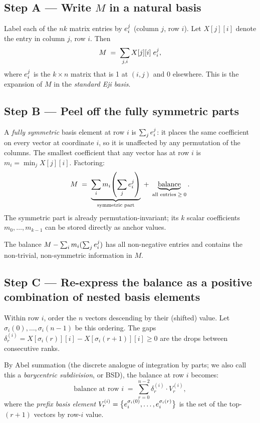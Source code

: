 \subsection*{Step A — Write $M$ in a natural basis}

Label each of the $nk$ matrix entries by $e^{j}_{i}$ (column $j$, row $i$).
Let $X[j][i]$ denote the entry in column $j$, row $i$.  Then
\[
  M \;=\; \sum_{j,i} X[j][i]\;e^{j}_{i},
\]
where $e^{j}_{i}$ is the $k\times n$ matrix that is 1 at $(i,j)$ and 0
elsewhere.  This is the expansion of $M$ in the \emph{standard Eji basis}.

\subsection*{Step B — Peel off the fully symmetric parts}

A \emph{fully symmetric} basis element at row $i$ is $\sum_j e^{j}_{i}$: it
places the same coefficient on every vector at coordinate $i$, so it is
unaffected by any permutation of the columns.  The smallest coefficient that
any vector has at row $i$ is $m_i = \min_j X[j][i]$.  Factoring:
\[
  M \;=\; \underbrace{\sum_i m_i \!\left(\sum_j e^{j}_{i}\right)}_{\text{symmetric part}}
    \;+\; \underbrace{\text{balance}}_{\text{all entries} \;\ge\; 0}.
\]
The symmetric part is already permutation-invariant; its $k$ scalar
coefficients $m_0,\ldots,m_{k-1}$ can be stored directly as anchor values.

The balance $M - \sum_i m_i (\sum_j e^{j}_{i})$ has all non-negative
entries and contains the non-trivial, non-symmetric information in $M$.

\subsection*{Step C — Re-express the balance as a positive combination of
             nested basis elements}

Within row $i$, order the $n$ vectors descending by their (shifted) value.
Let $\sigma_i(0),\ldots,\sigma_i(n-1)$ be this ordering.  The gaps
$\delta^{(i)}_r = X[\sigma_i(r)][i] - X[\sigma_i(r+1)][i] \ge 0$ are the
drops between consecutive ranks.

By Abel summation (the discrete analogue of integration by parts; we also call
this a \emph{barycentric subdivision}, or BSD), the balance
at row $i$ becomes:
\[
  \text{balance at row }i
    \;=\; \sum_{r=0}^{n-2} \delta^{(i)}_r \cdot V^{(i)}_r,
\]
where the \emph{prefix basis element} $V^{(i)}_r =
\bigl\{e^{\sigma_i(0)}_{i},\ldots, e^{\sigma_i(r)}_{i}\bigr\}$
is the set of the top-$(r{+}1)$ vectors by row-$i$ value.

